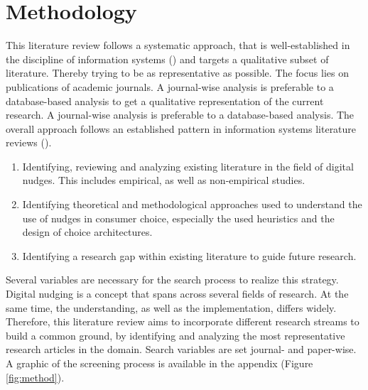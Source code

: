 \section{Methodology}
This literature review follows a systematic approach, that is well-established in the discipline of information systems (\cite{webster_analyzing_2002}) and targets a qualitative subset of literature. Thereby trying to be as representative as possible. The focus lies on publications of academic journals. A journal-wise analysis is preferable to a database-based analysis to get a qualitative representation of the current research. A journal-wise analysis is preferable to a database-based analysis. The overall approach follows an established pattern in information systems literature reviews (\cite{alavi_review_1992}).
\begin{enumerate}
\item Identifying, reviewing and analyzing existing literature in the field of digital nudges. This includes empirical, as well as non-empirical studies.
\item Identifying theoretical and methodological approaches used to understand the use of nudges in consumer choice, especially the used heuristics and the design of choice architectures.
\item Identifying a research gap within existing literature to guide future research.
\end{enumerate}

Several variables are necessary for the search process to realize this strategy. Digital nudging is a concept that spans across several fields of research. At the same time, the understanding, as well as the implementation, differs widely. Therefore, this literature review aims to incorporate different research streams to build a common ground, by identifying and analyzing the most representative research articles in the domain. Search variables are set journal- and paper-wise. A graphic of the screening process is available in the appendix (Figure \ref{fig:method}).

